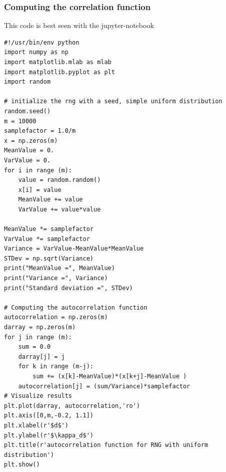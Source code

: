 \documentclass{beamer}
\begin{document}
\begin{frame}
\frametitle{Computing the correlation function}

This code is best seen with the jupyter-notebook












































\begin{verbatim}
#!/usr/bin/env python
import numpy as np
import matplotlib.mlab as mlab
import matplotlib.pyplot as plt
import random

# initialize the rng with a seed, simple uniform distribution
random.seed() 
m = 10000
samplefactor = 1.0/m
x = np.zeros(m)   
MeanValue = 0.
VarValue = 0.
for i in range (m):
    value = random.random()
    x[i] = value
    MeanValue += value
    VarValue += value*value

MeanValue *= samplefactor
VarValue *= samplefactor
Variance = VarValue-MeanValue*MeanValue
STDev = np.sqrt(Variance)
print("MeanValue =", MeanValue)
print("Variance =", Variance)
print("Standard deviation =", STDev)

# Computing the autocorrelation function
autocorrelation = np.zeros(m)
darray = np.zeros(m)
for j in range (m):
    sum = 0.0
    darray[j] = j
    for k in range (m-j):
        sum += (x[k]-MeanValue)*(x[k+j]-MeanValue ) 
    autocorrelation[j] = (sum/Variance)*samplefactor
# Visualize results
plt.plot(darray, autocorrelation,'ro')
plt.axis([0,m,-0.2, 1.1])
plt.xlabel(r'$d$')
plt.ylabel(r'$\kappa_d$')
plt.title(r'autocorrelation function for RNG with uniform distribution')
plt.show()

\end{verbatim}
\end{frame}
\end{document}
